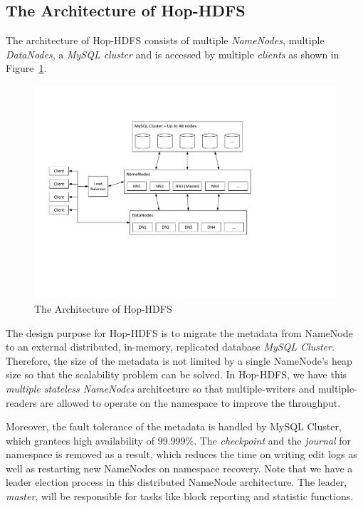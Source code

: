 \subsection{The Architecture of Hop-HDFS}

\noindent The architecture of Hop-HDFS consists of multiple \textit{NameNodes}, multiple \textit{DataNodes}, a \textit{MySQL cluster} and is accessed by multiple \textit{clients} as shown in Figure~\ref{fig:hophdfsarchitecture}.

\begin{figure}[h!]
	\centering
	\includegraphics[scale=0.7]{figs/HopHDFSArchitecture.pdf}
	\caption{The Architecture of Hop-HDFS}
	\label{fig:hophdfsarchitecture}
\end{figure}

\noindent The design purpose for Hop-HDFS is to migrate the metadata from NameNode to an external distributed, in-memory, replicated database \textit{MySQL Cluster}. Therefore, the size of the metadata is not limited by a single NameNode's heap size so that the scalability problem can be solved. In Hop-HDFS, we have this \textit{multiple stateless NameNodes} architecture so that multiple-writers and multiple-readers are allowed to operate on the namespace to improve the throughput. 

\noindent Moreover, the fault tolerance of the metadata is handled by MySQL Cluster, which grantees high availability of 99.999\%. The \textit{checkpoint} and the \textit{journal} for namespace is removed as a result, which reduces the time on writing edit logs as well as restarting new NameNodes on namespace recovery. Note that we have a leader election process in this distributed NameNode architecture. The leader, \textit{master}, will be responsible for tasks like block reporting and statistic functions.

